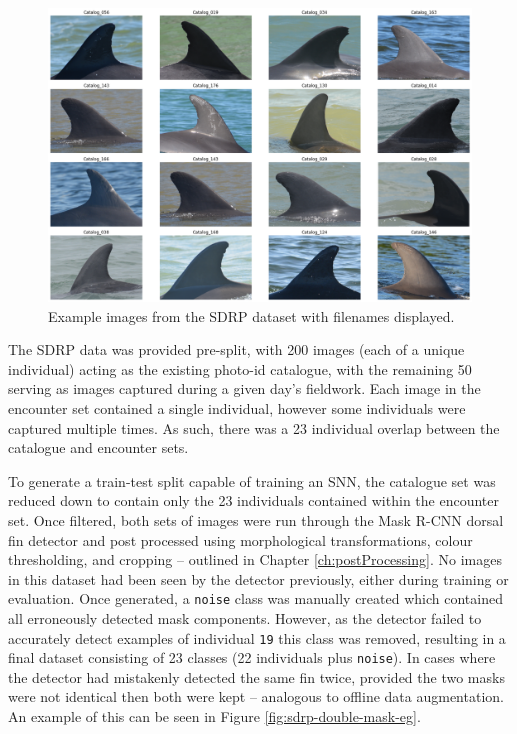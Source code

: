 \begin{figure}
	\begin{center}
		\includegraphics[scale=0.3]{Chapter7/figs/SDRP_egs_tiled.png}
	\end{center}
	\caption{Example images from the SDRP dataset with filenames displayed.}
	\label{fig:sdrp-example}
\end{figure}

The SDRP data was provided pre-split, with 200 images (each of a unique individual) acting as the existing photo-id catalogue, with the remaining 50 serving as images captured during a given day's fieldwork. Each image in the encounter set contained a single individual, however some individuals were captured multiple times. As such, there was a 23 individual overlap between the catalogue and encounter sets. 

To generate a train-test split capable of training an SNN, the catalogue set was reduced down to contain only the 23 individuals contained within the encounter set. Once filtered, both sets of images were run through the Mask R-CNN dorsal fin detector and post processed using morphological transformations, colour thresholding, and cropping -- outlined in Chapter \ref{ch:postProcessing}. No images in this dataset had been seen by the detector previously, either during training or evaluation. Once generated, a \texttt{noise} class was manually created which contained all erroneously detected mask components. However, as the detector failed to accurately detect examples of individual \texttt{19} this class was removed, resulting in a final dataset consisting of 23 classes (22 individuals plus \texttt{noise}). In cases where the detector had mistakenly detected the same fin twice, provided the two masks were not identical then both were kept -- analogous to offline data augmentation. An example of this can be seen in Figure \ref{fig:sdrp-double-mask-eg}.

